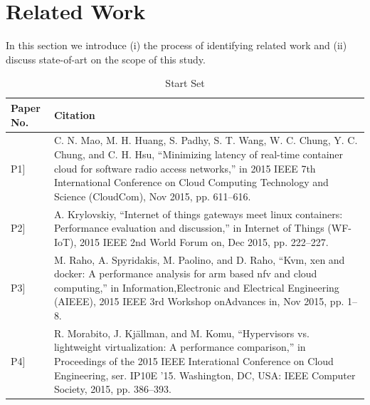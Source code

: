 \chapter{Related Work} \label{section:relatedwork} 
In this section we introduce (i) the process of identifying related work and (ii) discuss state-of-art on the scope of this study. 

\begin{table}[ht]
\renewcommand{\arraystretch}{1.4}
\centering
\caption{Start Set}
\label{lr-startset}
\begin{tabular}{| >{\centering}m{1.3cm} |>{\arraybackslash}m{12.7cm}|}
\hline
\textbf{Paper No.} & \textbf{Citation}\\ \hline
{[}P1{]}  & C. N. Mao, M. H. Huang, S. Padhy, S. T. Wang, W. C. Chung, Y. C. Chung, and C. H. Hsu, “Minimizing latency of real-time container cloud for software radio access networks,” in 2015 IEEE 7th International Conference on Cloud Computing Technology and Science (CloudCom), Nov 2015, pp. 611–616.                                  \\
{[}P2{]}  & A. Krylovskiy, “Internet of things gateways meet linux containers: Performance evaluation and discussion,” in Internet of Things (WF-IoT), 2015 IEEE 2nd World Forum on, Dec 2015, pp. 222–227.                                                                                                                                      \\
{[}P3{]}  & M. Raho, A. Spyridakis, M. Paolino, and D. Raho, “Kvm, xen and docker: A performance analysis for arm based nfv and cloud computing,” in Information,Electronic and Electrical Engineering (AIEEE), 2015 IEEE 3rd Workshop onAdvances in, Nov 2015, pp. 1–8.                                                                         \\
{[}P4{]}  & R. Morabito, J. Kj\"allman, and M. Komu, “Hypervisors vs. lightweight virtualization: A performance comparison,” in Proceedings of the 2015 IEEE Interational Conference on Cloud Engineering, ser. IP10E ’15. Washington, DC, USA: IEEE Computer Society, 2015, pp. 386–393.                                                      \\

\end{tabular}
\end{table}
